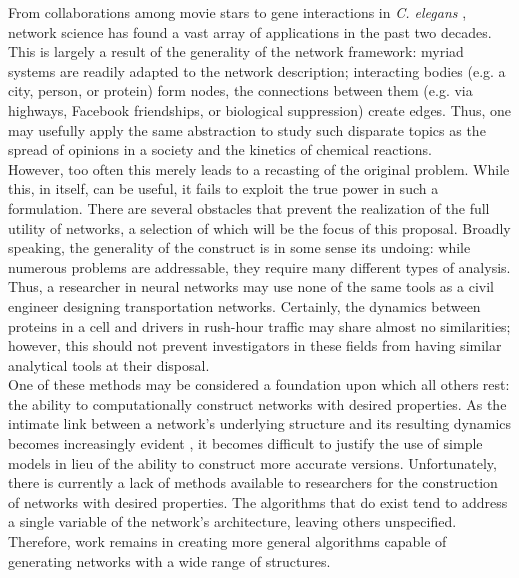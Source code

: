 \documentclass[11pt]{article}
\begin{document}
\indent From collaborations among movie stars \cite{Barabasi1999} to gene interactions in \textit{C. elegans} \cite{Dreze2009}, network science has found a vast array of applications in the past two decades. This is largely a result of the generality of the network framework: myriad systems are readily adapted to the network description; interacting bodies (e.g. a city, person, or protein) form nodes, the connections between them (e.g. via highways, Facebook friendships, or biological suppression) create edges. Thus, one may usefully apply the same abstraction to study such disparate topics as the spread of opinions in a society and the kinetics of chemical reactions. \vspace{1mm}\\
\indent However, too often this merely leads to a recasting of the original problem. While this, in itself, can be useful, it fails to exploit the true power in such a formulation. There are several obstacles that prevent the realization of the full utility of networks, a selection of which will be the focus of this proposal. Broadly speaking, the generality of the construct is in some sense its undoing: while numerous problems are addressable, they require many different types of analysis. Thus, a researcher in neural networks may use none of the same tools as a civil engineer designing transportation networks. Certainly, the dynamics between proteins in a cell and drivers in rush-hour traffic may share almost no similarities; however, this should not prevent investigators in these fields from having similar analytical tools at their disposal. \vspace{1mm}\\ 
\indent One of these methods may be considered a foundation upon which all others rest: the ability to computationally construct networks with desired properties. As the intimate link between a network's underlying structure and its resulting dynamics becomes increasingly evident \cite{Barabasi1999} \cite{Barzel2013}, it becomes difficult to justify the use of simple models in lieu of the ability to construct more accurate versions. Unfortunately, there is currently a lack of methods available to researchers for the construction of networks with desired properties. The algorithms that do exist tend to address a single variable of the network's architecture, leaving others unspecified. Therefore, work remains in creating more general algorithms capable of generating networks with a wide range of structures.\vspace{1mm}\\
\end{document}
